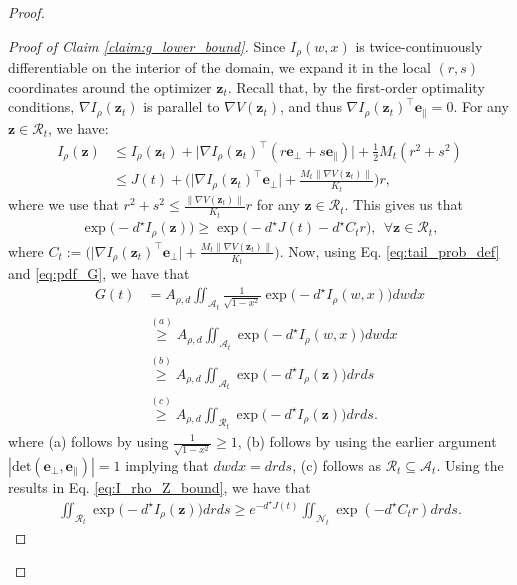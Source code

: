 \documentclass[12pt]{article}
\theoremstyle{definition}
\theoremstyle{remark}
\begin{document}
\begin{proof}
\begin{proof}[Proof of Claim \ref{claim:g_lower_bound}]
Since $I_{\rho}(w, x)$ is twice-continuously differentiable on the interior of the domain, we expand it in the local $(r, s)$ coordinates around the optimizer $\mathbf{z}_t$. Recall that, by the first-order optimality conditions, $\nabla I_{\rho}(\mathbf{z}_t)$ is parallel to $\nabla V(\mathbf{z}_t)$, and thus $\nabla I_{\rho}(\mathbf{z}_t)^\top \mathbf{e}_{\parallel} = 0$. For any $\mathbf{z} \in \mathcal{R}_t$, we have:
\begin{align*}
I_{\rho}(\mathbf{z}) &\leq I_{\rho}(\mathbf{z}_t) + \big|\nabla I_{\rho}(\mathbf{z}_t)^\top (r \mathbf{e}_{\perp} + s \mathbf{e}_{\parallel})\big| + \frac{1}{2} M_t (r^2 + s^2) \\
&\leq J(t) + \Big(\big|\nabla I_{\rho}(\mathbf{z}_t)^\top \mathbf{e}_{\perp}\big| + \frac{M_t \|\nabla V(\mathbf{z}_t)\|}{K_t}\Big) r,
\end{align*}
where we use that $r^2 + s^2 \leq \frac{ \|\nabla V(\mathbf{z}_t)\|}{K_t}r$ for any $\mathbf{z} \in \mathcal{R}_t$. This gives us that
\begin{align}
\label{eq:I_rho_Z_bound}
\exp\big(-d^\star I_{\rho}(\mathbf{z})\big) \geq \exp\big(-d^\star J(t) - d^\star C_t r\big), \ \ \forall \mathbf{z} \in \mathcal{R}_t,
\end{align}
where $C_t := \Big(\big|\nabla I_{\rho}(\mathbf{z}_t)^\top \mathbf{e}_{\perp}\big| + \frac{M_t \|\nabla V(\mathbf{z}_t)\|}{K_t}\Big)$. Now, using Eq. \eqref{eq:tail_prob_def} and \eqref{eq:pdf_G}, we have that
\begin{align*}
G(t) &=  A_{\rho, d} \iint_{\mathcal{A}_t} \frac{1}{\sqrt{1-x^2}}  \exp\big(-d^\star I_{\rho}(w, x)\big) dw dx \\
& \stackrel{(a)}{\geq} A_{\rho, d} \iint_{\mathcal{A}_t} \exp\big(-d^\star I_{\rho}(w, x)\big) dw dx \\
&\stackrel{(b)}{\geq} A_{\rho, d} \iint_{\mathcal{A}_t} \exp\big(-d^\star I_{\rho}(\mathbf{z})\big) dr ds \\
& \stackrel{(c)}{\geq} A_{\rho, d} \iint_{\mathcal{R}_t} \exp\big(-d^\star I_{\rho}(\mathbf{z})\big) dr ds.
\end{align*}
where (a) follows by using $\frac{1}{\sqrt{1-x^2}} \geq 1$, (b) follows by using the earlier argument $|\text{det}(\mathbf{e}_\perp, \mathbf{e}_\parallel)| =1$ implying that $dwdx = drds$, (c) follows as $\mathcal{R}_t \subseteq \mathcal{A}_t$. Using the results in Eq. \eqref{eq:I_rho_Z_bound}, we have that
\begin{align*}
    \iint_{\mathcal{R}_t} \exp\big(-d^\star I_{\rho}(\mathbf{z})\big) dr ds \geq e^{- d^\star J(t)} \iint_{\mathcal{N}_t} \exp\left( - d^\star C_t r\right) drds.

\end{align*}
\end{proof}
\end{proof}
\end{document}
